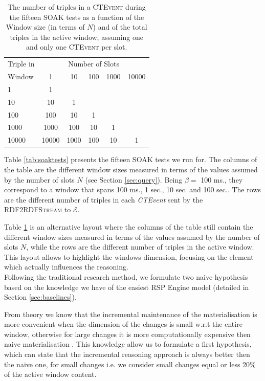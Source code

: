 \begin{table}[htb]
	\centering
	\normalsize
	\begin{tabular}{l | ccccc} %
	  	\hline
		Triple in & \multicolumn{5}{c}{Number of Slots}  \\
		Window  & 1 & 10 & 100 & 1000&10000\\
		\hline
		1  	 & 1\\
		10   & 10  & 1 \\
		100  & 100 & 10 & 1\\
		1000 & 1000& 100& 10& 1\\
		10000& 10000 & 1000& 100& 10& 1\\
		\hline %
	 \end{tabular}
	\caption[SOAK Tests Summary Table Alternative Layout]{The number of triples in a \textsc{CTEvent} during the fifteen SOAK tests as a function of the Window size (in terms of $N$) and of the total triples in the active window, assuming one and only one \textsc{CTEvent} per slot.}
	\label{tab:soaktests-alt}
\end{table}

Table \ref{tab:soaktests} presents the fifteen SOAK tests we run for. The columns of the table are the different window sizes measured in terms of the values assumed by the number of slots $N$ (see Section \ref{sec:query}).  Being $\beta=$ 100 ms., they correspond to a window that spans 100 ms., 1 sec., 10 sec. and 100 sec.. The rows are the different number of triples in each \textit{CTEvent} sent by the \textsc{RDF2RDFStream} to $\mathcal{E}$.%

Table \ref{tab:soaktests-alt} is an alternative layout where the columns of the table still contain the different window sizes measured in terms of the values assumed by the number of slots $N$, while the rows are the different number of triples in the active window. This layout allows to highlight the windows dimension, focusing on the element which actually influences the reasoning.\\

\noindent Following the traditional research method, we formulate two naive hypothesis based on the knowledge we have of the easiest RSP Engine model (detailed in Section \ref{sec:baselines}). 

From theory we know that the incremental maintenance of the materialisation is more convenient when the dimension of the changes is small w.r.t the entire window, otherwise  for large changes it is more computationally expensive then  naive materialisation \cite{DellAglio2014,DBLP:conf/cikm/RenP11,DBLP:conf/semweb/UrbaniMJHB13}.
This knowledge allow us to formulate a first hypothesis, which can state that the incremental reasoning approach is always better then the naive one, for small changes i.e. we consider small changes equal or less 20\% of the active window content.


